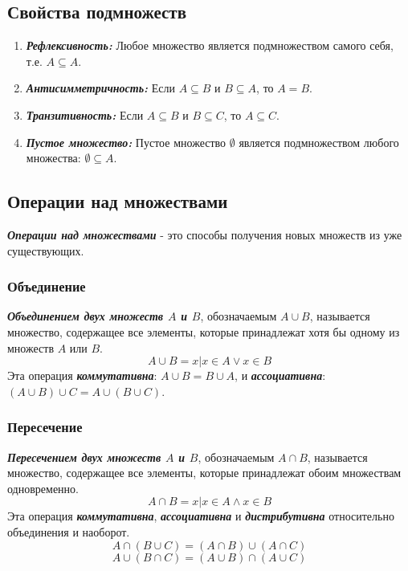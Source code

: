 \documentclass[12pt,letterpaper]{article}
\begin{document}
\subsection{Свойства подмножеств}

\begin{enumerate}
  \item \textbf{\emph{Рефлексивность:}} Любое множество является подмножеством самого себя, т.е. \(A \subseteq A\).
  \item \textbf{\emph{Антисимметричность:}} Если \(A \subseteq B\) и \(B \subseteq A\), то \(A = B\).
  \item \textbf{\emph{Транзитивность:}} Если \(A \subseteq B\) и \(B \subseteq C\), то \(A \subseteq C\).
  \item \textbf{\emph{Пустое множество:}} Пустое множество \(\emptyset\) является подмножеством любого множества: \(\emptyset \subseteq A\).
\end{enumerate}

\subsection{Операции над множествами}

\textbf{\emph{Операции над множествами}} - это способы получения новых множеств из уже существующих.

\subsubsection{Объединение}

\textbf{\emph{Объединением двух множеств \(A\) и \(B\)}}, обозначаемым \(A \cup B\), называется множество, содержащее все элементы, которые принадлежат хотя бы одному из множеств \(A\) или \(B\).
\[A \cup B = x \vert x \in A \vee x \in B\]
Эта операция \textbf{\emph{коммутативна}}: \(A \cup B = B \cup A\), и \textbf{\emph{ассоциативна}}: \((A \cup B) \cup C = A \cup (B \cup C)\).

\subsubsection{Пересечение}

\textbf{\emph{Пересечением двух множеств \(A\) и \(B\)}}, обозначаемым \(A \cap B\), называется множество, содержащее все элементы, которые принадлежат обоим множествам одновременно.
\[A \cap B = x \vert x \in A \wedge x \in B\]
Эта операция \textbf{\emph{коммутативна}}, \textbf{\emph{ассоциативна}} и \textbf{\emph{дистрибутивна}} относительно объединения и наоборот.
\[A \cap (B \cup C) = (A \cap B) \cup (A \cap C)\]
\[A \cup (B \cap C) = (A \cup B) \cap (A \cup C)\]
\end{document}
